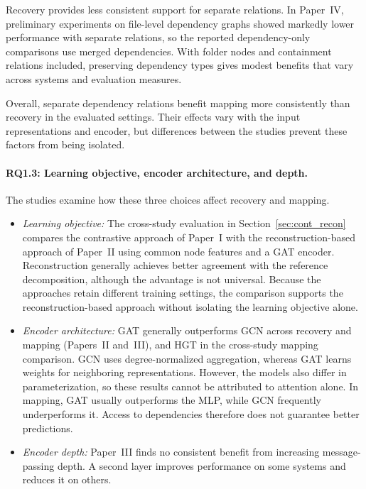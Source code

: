 Recovery provides less consistent support for separate relations. In Paper~IV, preliminary experiments on file-level dependency graphs showed markedly lower performance with separate relations, so the reported dependency-only comparisons use merged dependencies. With folder nodes and containment relations included, preserving dependency types gives modest benefits that vary across systems and evaluation measures.

Overall, separate dependency relations benefit mapping more consistently than recovery in the evaluated settings. Their effects vary with the input representations and encoder, but differences between the studies prevent these factors from being isolated.

\paragraph{RQ1.3: Learning objective, encoder architecture, and depth.} The studies examine how these three choices affect recovery and mapping.

\begin{itemize}[leftmargin=1.1em, topsep=3pt] %
\item \emph{Learning objective:} The cross-study evaluation in Section~\ref{sec:cont_recon} compares the contrastive approach of Paper~I with the reconstruction-based approach of Paper~II using common node features and a GAT encoder. Reconstruction generally achieves better agreement with the reference decomposition, although the advantage is not universal. Because the approaches retain different training settings, the comparison supports the reconstruction-based approach without isolating the learning objective alone.

\item \emph{Encoder architecture:} GAT generally outperforms GCN across recovery and mapping (Papers~II and~III), and HGT in the cross-study mapping comparison. GCN uses degree-normalized aggregation, whereas GAT learns weights for neighboring representations. However, the models also differ in parameterization, so these results cannot be attributed to attention alone. In mapping, GAT usually outperforms the MLP, while GCN frequently underperforms it. Access to dependencies therefore does not guarantee better predictions.

\item \emph{Encoder depth:} Paper~III finds no consistent benefit from increasing message-passing depth. A second layer improves performance on some systems and reduces it on others.
\end{itemize}

